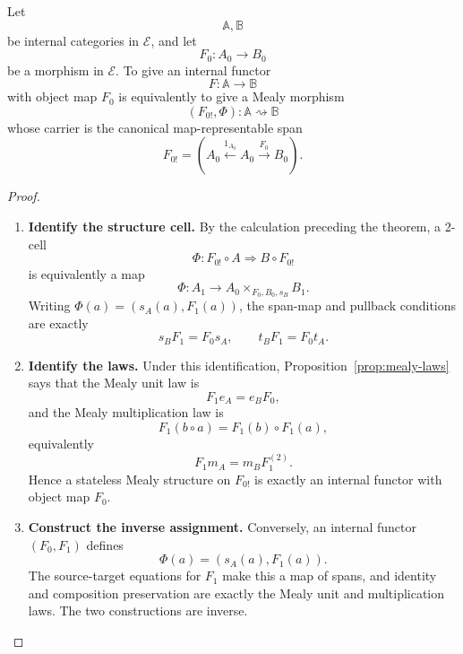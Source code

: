 \begin{theorem}
\label{thm:representable-mealy-internal-functor}
    Let
    \[
        \mathbb A,\mathbb B
    \]
    be internal categories in \(\mathcal E\), and let
    \[
        F_0:A_0\to B_0
    \]
    be a morphism in \(\mathcal E\). To give an internal functor
    \[
        F:\mathbb A\to\mathbb B
    \]
    with object map \(F_0\) is equivalently to give a Mealy morphism
    \[
        (F_{0!},\Phi):\mathbb A\rightsquigarrow\mathbb B
    \]
    whose carrier is the canonical map-representable span
    \[
        F_{0!}
        =
        \left(
            A_0
            \xleftarrow{1_{A_0}}
            A_0
            \xrightarrow{F_0}
            B_0
        \right).
    \]
\end{theorem}
\begin{proof}
    \leavevmode
    \begin{enumerate}
        \item \textbf{Identify the structure cell.} By the calculation preceding the theorem, a 2-cell
        \[
            \Phi:F_{0!}\circ A\Rightarrow B\circ F_{0!}
        \]
        is equivalently a map
        \[
            \Phi:A_1\to A_0\times_{F_0,B_0,s_B}B_1.
        \]
        Writing \(\Phi(a)=(s_A(a),F_1(a))\), the span-map and pullback conditions are exactly
        \[
            s_BF_1=F_0s_A,
            \qquad
            t_BF_1=F_0t_A.
        \]

        \item \textbf{Identify the laws.} Under this identification, Proposition~\ref{prop:mealy-laws} says that the Mealy unit law is
        \[
            F_1e_A=e_BF_0,
        \]
        and the Mealy multiplication law is
        \[
            F_1(b\circ a)=F_1(b)\circ F_1(a),
        \]
        equivalently
        \[
            F_1m_A=m_BF_1^{(2)}.
        \]
        Hence a stateless Mealy structure on \(F_{0!}\) is exactly an internal functor with object map \(F_0\).

        \item \textbf{Construct the inverse assignment.} Conversely, an internal functor \((F_0,F_1)\) defines
        \[
            \Phi(a)=(s_A(a),F_1(a)).
        \]
        The source-target equations for \(F_1\) make this a map of spans, and identity and composition preservation are exactly the Mealy unit and multiplication laws. The two constructions are inverse.
    \end{enumerate}
\end{proof}

